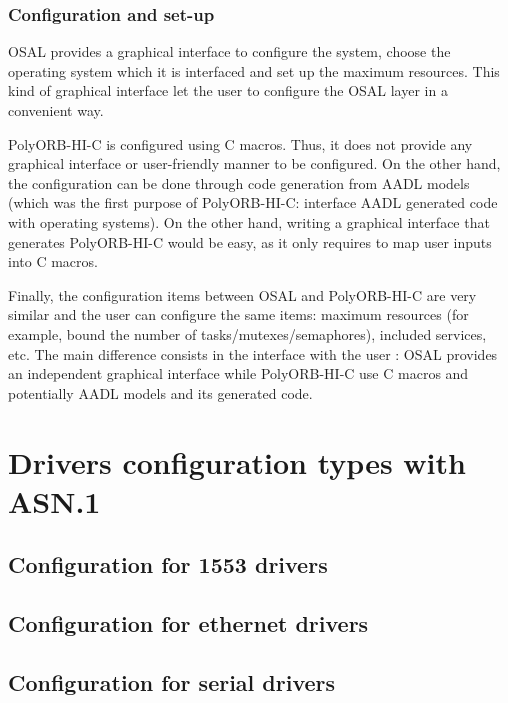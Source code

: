 \documentclass[11pt]{book}
\begin{document}
{         \subsection{Configuration and set-up}
         OSAL provides a graphical interface to configure the system, choose the
         operating system which it is interfaced and set up the maximum
         resources. This kind of graphical interface let the user to configure
         the OSAL layer in a convenient way.

         PolyORB-HI-C is configured using C macros. Thus, it does not provide
         any graphical interface or user-friendly manner to be configured. On
         the other hand, the configuration can be done through code generation
         from AADL models (which was the first purpose of PolyORB-HI-C:
         interface AADL generated code with operating systems). On the other
         hand, writing a graphical interface that generates PolyORB-HI-C would
         be easy, as it only requires to map user inputs into C macros.

         Finally, the configuration items between OSAL and PolyORB-HI-C are very
         similar and the user can configure the same items: maximum resources
         (for example, bound the number of tasks/mutexes/semaphores), included
         services, etc. The main difference consists in the interface with the
         user : OSAL provides an independent graphical interface while
         PolyORB-HI-C use C macros and potentially AADL models and its generated
         code.

   \chapter{Drivers configuration types with ASN.1}
   \label{driver-configuration-types}
      \section{Configuration for 1553 drivers}
      

      \section{Configuration for ethernet drivers}
      

      \section{Configuration for serial drivers}
      

}
\end{document}
